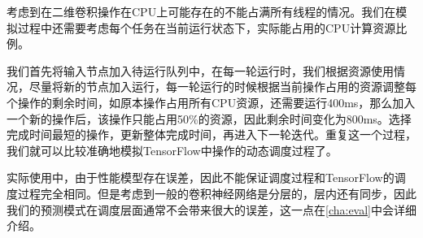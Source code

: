     考虑到在二维卷积操作在CPU上可能存在的不能占满所有线程的情况。我们在模拟过程中还需要考虑每个任务在当前运行状态下，实际能占用的CPU计算资源比例。

    我们首先将输入节点加入待运行队列中，在每一轮运行时，我们根据资源使用情况，尽量将新的节点加入运行，每一轮运行的时候根据当前操作占用的资源调整每个操作的剩余时间，如原本操作占用所有CPU资源，还需要运行400ms，那么加入一个新的操作后，该操作只能占用50\%的资源，因此剩余时间变化为800ms。选择完成时间最短的操作，更新整体完成时间，再进入下一轮迭代。重复这一个过程，我们就可以比较准确地模拟TensorFlow中操作的动态调度过程了。

    实际使用中，由于性能模型存在误差，因此不能保证调度过程和TensorFlow的调度过程完全相同。但是考虑到一般的卷积神经网络是分层的，层内还有同步，因此我们的预测模式在调度层面通常不会带来很大的误差，这一点在\ref{cha:eval}中会详细介绍。

